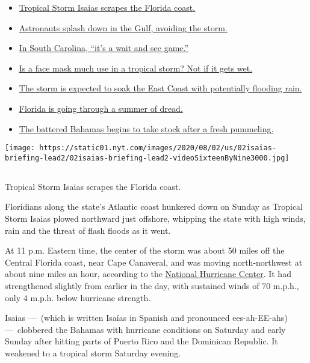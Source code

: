\begin{itemize}
\tightlist
\item
  \protect\hyperlink{link-6002fe80}{Tropical Storm Isaias scrapes the
  Florida coast.}
\item
  \protect\hyperlink{link-301f2153}{Astronauts splash down in the Gulf,
  avoiding the storm.}
\item
  \protect\hyperlink{link-17739c9a}{In South Carolina, ``it's a wait and
  see game.''}
\item
  \protect\hyperlink{link-e77dd06}{Is a face mask much use in a tropical
  storm? Not if it gets wet.}
\item
  \protect\hyperlink{link-6f11f4a6}{The storm is expected to soak the
  East Coast with potentially flooding rain.}
\item
  \protect\hyperlink{link-3c28a89f}{Florida is going through a summer of
  dread.}
\item
  \protect\hyperlink{link-2d06f1e8}{The battered Bahamas begins to take
  stock after a fresh pummeling.}
\end{itemize}

\texttt{[image: https://static01.nyt.com/images/2020/08/02/us/02isaias-briefing-lead2/02isaias-briefing-lead2-videoSixteenByNine3000.jpg]}

\subsection{}

Tropical Storm Isaias scrapes the Florida coast.

Floridians along the state's Atlantic coast hunkered down on Sunday as
Tropical Storm Isaias plowed northward just offshore, whipping the state
with high winds, rain and the threat of flash floods as it went.

At 11 p.m. Eastern time, the center of the storm was about 50 miles off
the Central Florida coast, near Cape Canaveral, and was moving
north-northwest at about nine miles an hour, according to the
\href{https://www.nhc.noaa.gov/text/refresh/MIATCPAT4+shtml/020856.shtml?}{National
Hurricane Center}. It had strengthened slightly from earlier in the day,
with sustained winds of 70 m.p.h., only 4 m.p.h. below hurricane
strength.

Isaias ---~(which is written Isaías in Spanish and pronounced
ees-ah-EE-ahs) ---~clobbered the Bahamas with hurricane conditions on
Saturday and early Sunday after hitting parts of Puerto Rico and the
Dominican Republic. It weakened to a tropical storm Saturday evening.

